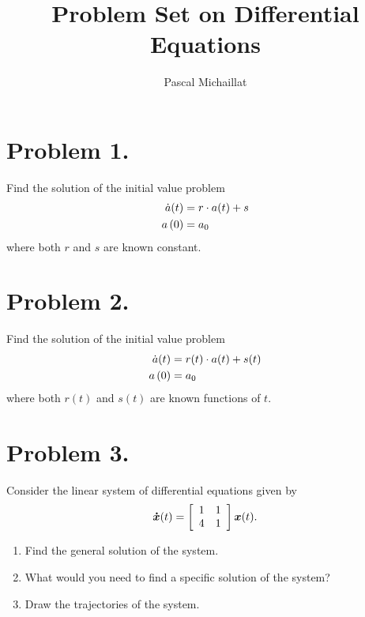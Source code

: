 \documentclass[letterpaper,12pt,leqno]{article}
\begin{document}
\title{Problem Set on Differential Equations}
\author{Pascal Michaillat}
\date{}

\begin{titlepage}
\maketitle
\end{titlepage}

\section*{Problem 1.}

Find the solution of the initial value problem 
\begin{align*}
\dot{a}(t) &=r\cdot a(t) +s \\
a\left( 0 \right) &=a_{0}
\end{align*}
where both $r$ and $s$ are known constant.

\section*{Problem 2.}

Find the solution of the initial value problem 
\begin{align*}
\dot{a}(t) &=r(t)\cdot a(t) +s(t) \\
a\left( 0 \right) &=a_{0}
\end{align*}
where both  $r(t)$ and $s(t)$ are known functions of $t.$

\section*{Problem 3.}

Consider the linear system of differential equations given by
\begin{equation*}
\bm{\dot{x}}(t)=\left[ 
\begin{array}{ll}
1 & 1 \\ 
4 & 1
\end{array} \right] \bm{x}(t).
\end{equation*}
\begin{enumerate}
\item Find the general solution of the system.
\item What would you need to find a specific solution of the system?
\item Draw the trajectories of the system.
\end{enumerate}
\end{document}
